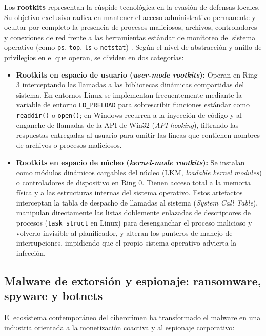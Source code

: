 \documentclass[12pt]{article}
\begin{document}
Los \textbf{rootkits} representan la cúspide tecnológica en la evasión de defensas locales. Su objetivo exclusivo radica en mantener el acceso administrativo permanente y ocultar por completo la presencia de procesos maliciosos, archivos, controladores y conexiones de red frente a las herramientas estándar de monitoreo del sistema operativo (como \texttt{ps}, \texttt{top}, \texttt{ls} o \texttt{netstat}) \parencite[\S 15.1, p.\ 658]{stallings2018operating}. Según el nivel de abstracción y anillo de privilegios en el que operan, se dividen en dos categorías:
\begin{itemize}[noitemsep, topsep=2pt]
    \item \textbf{Rootkits en espacio de usuario (\textit{user-mode rootkits}):} Operan en Ring 3 interceptando las llamadas a las bibliotecas dinámicas compartidas del sistema. En entornos Linux se implementan frecuentemente mediante la variable de entorno \texttt{LD\_PRELOAD} para sobrescribir funciones estándar como \texttt{readdir()} o \texttt{open()}; en Windows recurren a la inyección de código y al enganche de llamadas de la API de Win32 (\textit{API hooking}), filtrando las respuestas entregadas al usuario para omitir las líneas que contienen nombres de archivos o procesos maliciosos.
    \item \textbf{Rootkits en espacio de núcleo (\textit{kernel-mode rootkits}):} Se instalan como módulos dinámicos cargables del núcleo (LKM, \textit{loadable kernel modules}) o controladores de dispositivo en Ring 0. Tienen acceso total a la memoria física y a las estructuras internas del sistema operativo. Estos artefactos interceptan la tabla de despacho de llamadas al sistema (\textit{System Call Table}), manipulan directamente las listas doblemente enlazadas de descriptores de procesos (\texttt{task\_struct} en Linux) para desenganchar el proceso malicioso y volverlo invisible al planificador, y alteran los punteros de manejo de interrupciones, impidiendo que el propio sistema operativo advierta la infección.
\end{itemize}

\subsection{Malware de extorsión y espionaje: ransomware, spyware y botnets}\label{subsec:malwareExtorsionEspionajeRansomware}

El ecosistema contemporáneo del cibercrimen ha transformado el malware en una industria orientada a la monetización coactiva y al espionaje corporativo:
\end{document}
